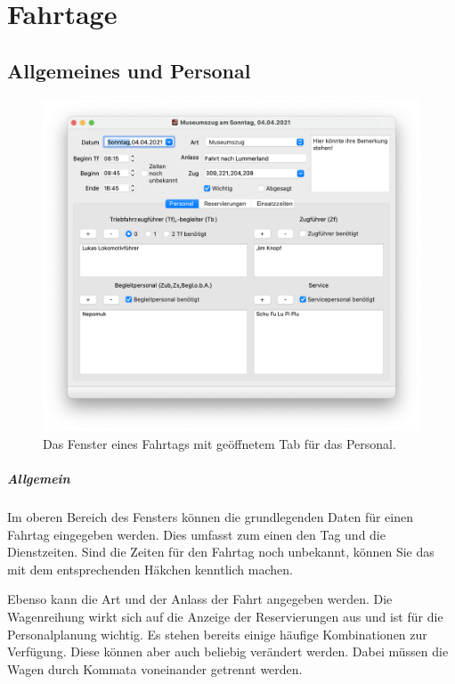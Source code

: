 \chapter{Fahrtage}\label{einsatz:fahrtag}
\section{Allgemeines und Personal}
\begin{figure}[!h]
	\includegraphics[width=\textwidth]{img/fahrtag_personal}
	\caption{Das Fenster eines Fahrtags mit geöffnetem Tab für das Personal.}
	\label{fig:einsatz:fahrtag:personal}
\end{figure}
\paragraph{Allgemein}
Im oberen Bereich des Fensters können die grundlegenden Daten für einen Fahrtag eingegeben werden.
Dies umfasst zum einen den Tag und die Dienstzeiten.
Sind die Zeiten für den Fahrtag noch unbekannt, können Sie das mit dem entsprechenden Häkchen kenntlich machen.

Ebenso kann die Art und der Anlass der Fahrt angegeben werden.
Die Wagenreihung wirkt sich auf die Anzeige der Reservierungen aus und ist für die Personalplanung wichtig.
Es stehen bereits einige häufige Kombinationen zur Verfügung.
Diese können aber auch beliebig verändert werden.
Dabei müssen die Wagen durch Kommata voneinander getrennt werden.

